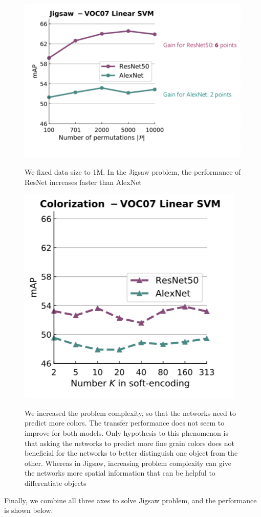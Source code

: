 \begin{figure}[H]
\centering
\includegraphics[width=0.8\linewidth]{lectures/14-b/graphics/jigsaw2.png}
\label{fig:jigsaw2}
\caption{We fixed data size to 1M. In the Jigsaw problem, the performance of ResNet increases faster than AlexNet}
\end{figure}

\begin{figure}[H]
\centering
\includegraphics[width=0.6\linewidth]{lectures/14-b/graphics/colorization2.png}
\label{fig:colorization2}
\caption{We increased the problem complexity, so that the networks need to predict more colors. The transfer performance does not seem to improve for both models. Only hypothesis to this phenomenon is that asking the networks to predict more fine grain colors does not beneficial for the networks to better distinguish one object from the other. Whereas in Jigsaw, increasing problem complexity can give the networks more spatial information that can be helpful to differentiate objects}
\end{figure}

Finally, we combine all three axes to solve Jigsaw problem, and the performance  is shown below.


